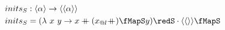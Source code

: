 \documentclass[preview]{standalone}
\begin{document}
\begin{align*}
  inits_S &: \vect{\alpha} \rightarrow \vect{\vect{\alpha}} \\
  inits_S & = (\lambda\ x\ y \rightarrow x \fcat (x_{@l} \fcat) \fMapS y) \redS \cdot \vect{\vect{}} \fMapS
\end{align*}
\end{document}
